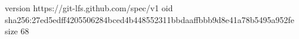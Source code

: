 version https://git-lfs.github.com/spec/v1
oid sha256:27ed5edff4205506284bced4b448552311bbdaaffbbb9d8e41a78b5495a952fe
size 68
